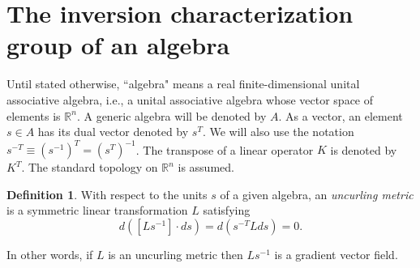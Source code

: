 \documentclass{amsart}
\numberwithin{equation}{section}
\theoremstyle{definition}
\newtheorem{definition}{Definition}[section]
\numberwithin{theorem}{section}
\begin{document}
   \section{The inversion characterization group of an algebra}
   
      Until stated otherwise, ``algebra" means a real finite-dimensional unital associative algebra, i.e., a unital associative algebra whose vector space of elements is $\mathbb{R}^n$.  A generic algebra will be denoted by $A$.  As a vector, an element $s\in A$ has its dual vector denoted by $s^T$.  We will also use the notation $s^{-T} \equiv (s^{-1})^T = (s^T)^{-1}$.  The transpose of a linear operator $K$ is denoted by $K^T$.  The standard topology on $\mathbb{R}^n$ is assumed.


   
   \begin{definition} With respect to the units $s$ of a given algebra, an {\it uncurling metric} is a symmetric linear transformation $L$ satisfying \begin{equation}\label{4/7/23.1} d([Ls^{-1}]\cdot ds) = d\left(s^{-T}Lds\right) = 0.\end{equation} \end{definition}
   
   In other words, if $L$ is an uncurling metric then $Ls^{-1}$ is a gradient vector field.
\end{document}
